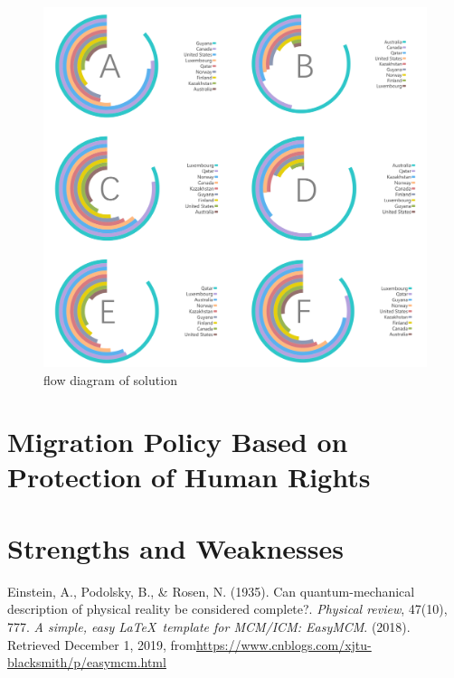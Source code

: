 \documentclass[12pt]{article}  %
\begin{document}
\begin{figure}[htbp]
	\centering
	\includegraphics[width=.8\textwidth]{ABCDEF.png}
	\caption{ flow diagram of solution}\label{ABCDEF}
\end{figure}


\newpage

\section{Migration Policy Based on Protection of Human Rights}





\section{Strengths and Weaknesses}






\begin{thebibliography}{99}
 Einstein, A., Podolsky, B., \& Rosen, N. (1935). Can quantum-mechanical description of physical reality be considered complete?. \emph{Physical review}, 47(10), 777.
 \emph{A simple, easy \LaTeX\ template for MCM/ICM: EasyMCM}. (2018). Retrieved December 1, 2019, from\url{https://www.cnblogs.com/xjtu-blacksmith/p/easymcm.html}
\end{thebibliography}
\end{document}
